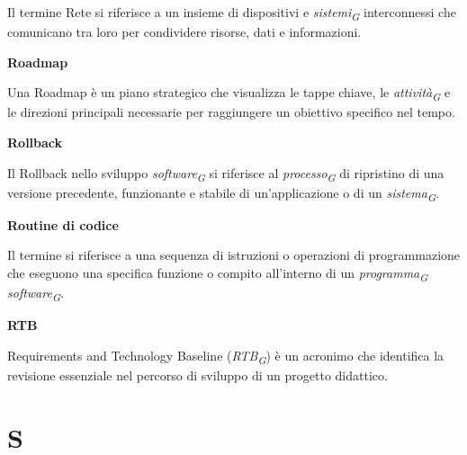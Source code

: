 \documentclass{article}
\begin{document}
Il termine Rete si riferisce a un insieme di dispositivi e \textit{sistemi}\textsubscript{\textit{G}} interconnessi che comunicano tra loro per condividere risorse, dati e informazioni.

\vspace{0.4cm}

\textbf{Roadmap}

\vspace{0.1cm}

Una Roadmap è un piano strategico che visualizza le tappe chiave, le \textit{attività}\textsubscript{\textit{G}} e le direzioni principali necessarie per raggiungere un obiettivo specifico nel tempo.

\vspace{0.4cm}

\textbf{Rollback}

\vspace{0.1cm}

Il Rollback nello sviluppo \textit{software}\textsubscript{\textit{G}} si riferisce al \textit{processo}\textsubscript{\textit{G}} di ripristino di una versione precedente, funzionante e stabile di un'applicazione o di un \textit{sistema}\textsubscript{\textit{G}}.

\vspace{0.4cm}

\textbf{Routine di codice}

\vspace{0.1cm}

Il termine si riferisce a una sequenza di istruzioni o operazioni di programmazione che eseguono una specifica funzione o compito all'interno di un \textit{programma}\textsubscript{\textit{G}} \textit{software}\textsubscript{\textit{G}}.

\pagebreak

\textbf{RTB}

\vspace{0.1cm}

Requirements and Technology Baseline (\textit{RTB}\textsubscript{\textit{G}}) è un acronimo che identifica la revisione essenziale nel percorso di sviluppo di un progetto didattico.

\pagebreak
\section*{S}
{}

\vspace{0.4cm}
\end{document}
